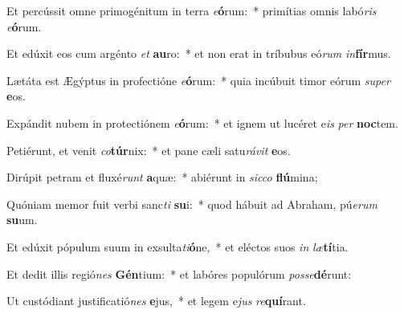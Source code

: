 \item Et percússit omne primogénitum in terra \textit{e}\textbf{ó}rum:~* primítias omnis labó\textit{ris} \textit{e}\textbf{ó}rum.
\item Et edúxit eos cum argénto \textit{et} \textbf{au}ro:~* et non erat in tríbubus eó\textit{rum} \textit{in}\textbf{fír}mus.
\item Lætáta est Ægýptus in profectióne \textit{e}\textbf{ó}rum:~* quia incúbuit timor eórum \textit{su}\textit{per} \textbf{e}os.
\item Expándit nubem in protectiónem \textit{e}\textbf{ó}rum:~* et ignem ut lucéret e\textit{is} \textit{per} \textbf{noc}tem.
\item Petiérunt, et venit \textit{co}\textbf{túr}nix:~* et pane cæli satu\textit{rá}\textit{vit} \textbf{e}os.
\item Dirúpit petram et fluxé\textit{runt} \textbf{a}quæ:~* abiérunt in \textit{sic}\textit{co} \textbf{flú}mina;
\item Quóniam memor fuit verbi sanc\textit{ti} \textbf{su}i:~* quod hábuit ad Abraham, pú\textit{e}\textit{rum} \textbf{su}um.
\item Et edúxit pópulum suum in exsulta\textit{ti}\textbf{ó}ne,~* et eléctos suos \textit{in} \textit{læ}\textbf{tí}tia.
\item Et dedit illis regió\textit{nes} \textbf{Gén}tium:~* et labóres populórum \textit{pos}\textit{se}\textbf{dé}runt:
\item Ut custódiant justificatió\textit{nes} \textbf{e}jus,~* et legem e\textit{jus} \textit{re}\textbf{quí}rant.
